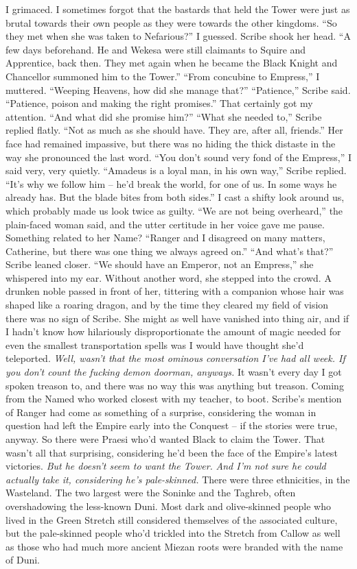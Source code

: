\documentclass[12pt, openany]{book}
\begin{document}
I grimaced. I sometimes forgot that the bastards that held the Tower were just as brutal towards their own people as they were towards the other kingdoms.
“So they met when she was taken to Nefarious?” I guessed.
Scribe shook her head. “A few days beforehand. He and Wekesa were still claimants to Squire and Apprentice, back then. They met again when he became the Black Knight and Chancellor summoned him to the Tower.”
“From concubine to Empress,” I muttered. “Weeping Heavens, how did she manage that?”
“Patience,” Scribe said. “Patience, poison and making the right promises.”
That certainly got my attention. “And what did she promise him?”
“What she needed to,” Scribe replied flatly. “Not as much as she should have. They are, after all, friends.”
Her face had remained impassive, but there was no hiding the thick distaste in the way she pronounced the last word.
“You don’t sound very fond of the Empress,” I said very, very quietly.
“Amadeus is a loyal man, in his own way,” Scribe replied. “It’s why we follow him – he’d break the world, for one of us. In some ways he already has. But the blade bites from both sides.”
I cast a shifty look around us, which probably made us look twice as guilty.
“We are not being overheard,” the plain-faced woman said, and the utter certitude in her voice gave me pause. Something related to her Name? “Ranger and I disagreed on many matters, Catherine, but there was one thing we always agreed on.”
“And what’s that?”
Scribe leaned closer.
“We should have an Emperor, not an Empress,” she whispered into my ear.
Without another word, she stepped into the crowd. A drunken noble passed in front of her, tittering with a companion whose hair was shaped like a roaring dragon, and by the time they cleared my field of vision there was no sign of Scribe. She might as well have vanished into thing air, and if I hadn’t know how hilariously disproportionate the amount of magic needed for even the smallest transportation spells was I would have thought she’d teleported. \textit{Well, wasn’t that the most ominous conversation I’ve had all week. If you don’t count the fucking demon doorman, anyways.} It wasn’t every day I got spoken treason to, and there was no way this was anything but treason. Coming from the Named who worked closest with my teacher, to boot.
Scribe’s mention of Ranger had come as something of a surprise, considering the woman in question had left the Empire early into the Conquest – if the stories were true, anyway. So there were Praesi who’d wanted Black to claim the Tower. That wasn’t all that surprising, considering he’d been the face of the Empire’s latest victories. \textit{But he doesn’t seem to want the Tower.} \textit{And I’m not sure he could actually take it, considering he’s pale-skinned.} There were three ethnicities, in the Wasteland. The two largest were the Soninke and the Taghreb, often overshadowing the less-known Duni. Most dark and olive-skinned people who lived in the Green Stretch still considered themselves of the associated culture, but the pale-skinned people who’d trickled into the Stretch from Callow as well as those who had much more ancient Miezan roots were branded with the name of Duni.
\end{document}
